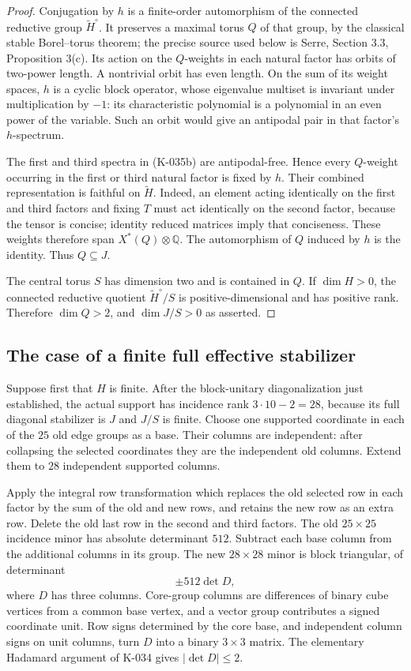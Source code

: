 \begin{proof}
Conjugation by $h$ is a finite-order automorphism of the connected
reductive group $\widetilde H^\circ$.  It preserves a maximal torus
$Q$ of that group, by the classical stable Borel--torus theorem;
the precise source used below is Serre, Section 3.3, Proposition
3(c).  Its action on the $Q$-weights in each natural factor has
orbits of two-power length.  A nontrivial orbit has even length.
On the sum of its weight spaces, $h$ is a cyclic block operator,
whose eigenvalue multiset is invariant under multiplication by
$-1$: its characteristic polynomial is a polynomial in an even
power of the variable.  Such an orbit would give an antipodal
pair in that factor's $h$-spectrum.

The first and third spectra in (K-035b) are antipodal-free.  Hence
every $Q$-weight occurring in the first or third natural factor
is fixed by $h$.  Their combined representation is faithful on
$\widetilde H$.  Indeed, an element acting identically on the
first and third factors and fixing $T$ must act identically on
the second factor, because the tensor is concise; identity
reduced matrices imply that conciseness.  These weights therefore
span $X^*(Q)\otimes\mathbb Q$.  The automorphism of $Q$ induced
by $h$ is the identity.  Thus $Q\subseteq J$.

The central torus $S$ has dimension two and is contained in $Q$.
If $\dim H>0$, the connected reductive quotient
$\widetilde H^\circ/S$ is positive-dimensional and has positive
rank.  Therefore $\dim Q>2$, and $\dim J/S>0$ as asserted.
\end{proof}

\subsection*{The case of a finite full effective stabilizer}

Suppose first that $H$ is finite.  After the block-unitary
diagonalization just established, the actual support has incidence
rank $3\cdot10-2=28$, because its full diagonal stabilizer is $J$
and $J/S$ is finite.  Choose one supported coordinate in each of
the $25$ old edge groups as a base.  Their columns are independent:
after collapsing the selected coordinates they are the independent
old columns.  Extend them to $28$ independent supported columns.

Apply the integral row transformation which replaces the old
selected row in each factor by the sum of the old and new rows,
and retains the new row as an extra row.  Delete the old last
row in the second and third factors.  The old $25\times25$
incidence minor has absolute determinant $512$.  Subtract each
base column from the additional columns in its group.  The new
$28\times28$ minor is block triangular, of determinant
\[
                            \pm512\det D,               \tag{K-035e}
\]
where $D$ has three columns.  Core-group columns are differences
of binary cube vertices from a common base vertex, and a vector
group contributes a signed coordinate unit.  Row signs determined
by the core base, and independent column signs on unit columns,
turn $D$ into a binary $3\times3$ matrix.  The elementary
Hadamard argument of K-034 gives $|\det D|\le2$.

